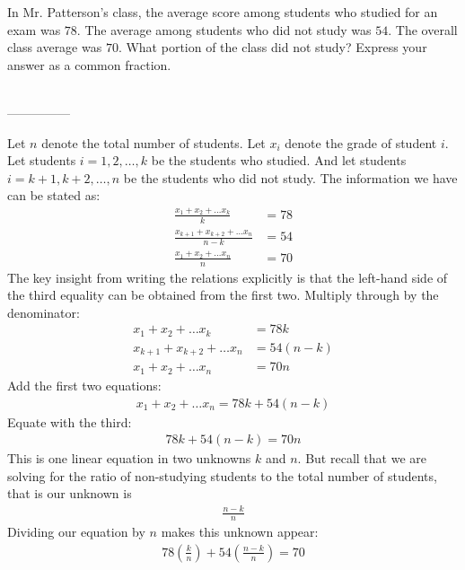 \documentclass[12pt]{article}
\begin{document}
In Mr. Patterson's class, the average score among students who studied for an exam was $78$. The average among students who did not study was $54$. The overall class average was $70$. What portion of the class did not study? Express your answer as a common fraction. 

\begin{minipage}[b]{\linewidth}
\fbox{\phantom{ANSWER}}\\
\mbox{---------------}\\
\fbox{\phantom{ANSWER}}
\end{minipage}

\begin{answer}
Let $n$ denote the total number of students. 
Let $x_i$ denote the grade of student $i$. Let students $i=1,2,\ldots,k$ be the students who studied. And let students $i=k+1,k+2,\ldots,n$ be the students who did not study. The information we have can be stated as:
\begin{align*}
\frac{x_1 + x_2 + \ldots x_k}{k} & = 78 \\ 
\frac{x_{k+1} + x_{k+2} + \ldots x_n}{n-k} & = 54 \\ 
\frac{x_1 + x_2 + \ldots x_n}{n} & = 70 
\end{align*}
The key insight from writing the relations explicitly is that the left-hand side of the third equality can be obtained from the first two. Multiply through by the denominator:
\begin{align*}
x_1 + x_2 + \ldots x_k & = 78 k\\ 
x_{k+1} + x_{k+2} + \ldots x_n & = 54 (n-k) \\ 
x_1 + x_2 + \ldots x_n & = 70 n 
\end{align*}
Add the first two equations:
\begin{align*}
x_1 + x_2 + \ldots x_n = 78 k + 54 (n-k)
\end{align*}
Equate with the third:
\begin{align*}
78 k + 54 (n-k) = 70 n
\end{align*}
This is one linear equation in two unknowns $k$ and $n$. But recall that we are solving for the ratio of non-studying students to the total number of students, that is our unknown is 
\begin{align*}
\frac{n-k}{n}
\end{align*}
Dividing our equation by $n$ makes this unknown appear:
\begin{align*}
78 \left(\frac{k}{n}\right) + 54 \left(\frac{n-k}{n}\right) = 70
\end{align*}

\end{answer}
\end{document}
